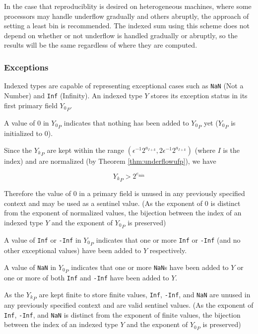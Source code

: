       In the case that reproduciblity is desired on heterogeneous machines,
      where some processors may handle underflow gradually and others abruptly,
      the approach of setting a least bin is recommended. The indexed sum using
      this scheme does not depend on whether or not underflow is handled
      gradually or abruptly, so the results will be the same regardless of
      where they are computed.

    \subsubsection{Exceptions}
      \label{sec:indexed_exceptions}
      Indexed types are capable of representing exceptional cases such as
      \texttt{NaN} (Not a Number) and \texttt{Inf} (Infinity). An indexed type
      $Y$ stores its exception status in its first primary field ${Y_0}_P$.

      A value of $0$ in ${Y_0}_P$ indicates that nothing has been added to
      ${Y_0}_P$ yet (${Y_0}_P$ is initialized to $0$).

      Since the ${Y_k}_P$ are kept within the range
      \(
      	(\epsilon^{-1}  2^{a_{I + k}}, 2 \epsilon^{-1} 2^{a_{I + k}})
      \) (where $I$ is the index) and are
      normalized (by Theorem \ref{thm:underflowufp}), we have

      \begin{equation*}
        {Y_k}_P > 2^{e_{\min}}
      \end{equation*}

      Therefore the value of $0$ in a primary field is unused in any previously
      specified context and may be used as a sentinel value. (As the exponent
      of $0$ is distinct from the exponent of normalized values, the bijection
      between the index of an indexed type $Y$ and the exponent of ${Y_0}_P$ is
      preserved)

      A value of \texttt{Inf} or \texttt{-Inf} in ${Y_0}_P$ indicates that one or more \texttt{Inf} or \texttt{-Inf} (and no other exceptional values) have been added to $Y$ respectively.

      A value of \texttt{NaN} in ${Y_0}_P$ indicates that one or more \texttt{NaN}s have been added to $Y$ or one or more of both \texttt{Inf} and \texttt{-Inf} have been added to $Y$.

      As the ${Y_k}_P$ are kept finite to store finite values, \texttt{Inf}, \texttt{-Inf}, and \texttt{NaN} are unused in any previously specified context and are valid sentinel values. (As the exponent of \texttt{Inf}, \texttt{-Inf}, and \texttt{NaN} is distinct from the exponent of finite values, the bijection between the index of an indexed type $Y$ and the exponent of ${Y_0}_P$ is preserved)

